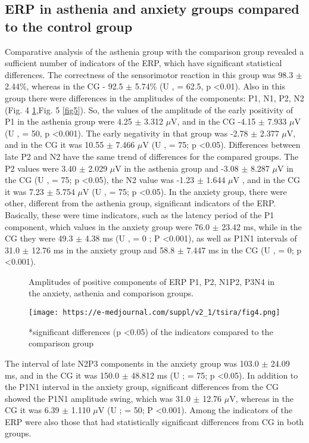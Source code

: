 \documentclass[twocolumn]{article}
\begin{document}
\subsection {ERP in asthenia and anxiety groups compared to the control group }
\par Comparative analysis of the asthenia group with the comparison group revealed a sufficient number of indicators of the ERP, which have significant statistical differences. The correctness of the sensorimotor reaction in this group was 98.3 $\pm$ 2.44\%, whereas in the CG - 92.5 $\pm$ 5.74\% (U \cite{bib15}, \cite{bib20} = 62.5, p \textless{}0.01). Also in this group there were differences in the amplitudes of the components: P1, N1, P2, N2 (Fig. 4 \ref{fig4},Fig. 5 \ref{fig5}). So, the values of the amplitude of the early positivity of P1 in the asthenia group were 4.25 $\pm$ 3.312 $\mu$V, and in the CG -4.15 $\pm$ 7.933 $\mu$V (U \cite{bib15}, \cite{bib20} = 50, p \textless{}0.001). The early negativity in that group was -2.78 $\pm$ 2.377 $\mu$V, and in the CG it was 10.55 $\pm$ 7.466 $\mu$V (U \cite{bib15}, \cite{bib20} = 75; p \textless{}0.05). Differences between late P2 and N2 have the same trend of differences for the compared groups. The P2 values were 3.40 $\pm$ 2.029 $\mu$V in the asthenia group and -3.08 $\pm$ 8.287 $\mu$V in the CG (U \cite{bib15}, \cite{bib20} = 75; p \textless{}0.05), the N2 value was -1.23 $\pm$ 1.644 $\mu$V , and in the CG it was 7.23 $\pm$ 5.754 $\mu$V (U \cite{bib15}, \cite{bib20} = 75; p \textless{}0.05). In the anxiety group, there were other, different from the asthenia group, significant indicators of the ERP. Basically, these were time indicators, such as the latency period of the P1 component, which values in the anxiety group were 76.0 $\pm$ 23.42 ms, while in the CG they were 49.3 $\pm$ 4.38 ms (U \cite{bib15}, \cite{bib20} = 0 ; P \textless{}0.001), as well as P1N1 intervals of 31.0 $\pm$ 12.76 ms in the anxiety group and 58.8 $\pm$ 7.447 ms in the CG (U \cite{bib15}, \cite{bib20} = 0; p \textless{}0.001). 
\begin{figure}
\caption{Amplitudes of positive components of ERP P1, P2, N1P2, P3N4 in the anxiety, asthenia and comparison groups.}
\label{fig4}
\texttt{[image: https://e-medjournal.com/suppl/v2\_1/tsira/fig4.png]}
\caption*{*significant differences (p \textless{}0.05) of the indicators compared to the comparison group}
\end{figure}
\par The interval of late N2P3 components in the anxiety group was 103.0 $\pm$ 24.09 ms, and in the CG it was 150.0 $\pm$ 48.812 ms (U \cite{bib15}; \cite{bib20} = 75; p \textless{}0.05). In addition to the P1N1 interval in the anxiety group, significant differences from the CG showed the  P1N1 amplitude swing, which was 31.0 $\pm$ 12.76 $\mu$V, whereas in the CG it was 6.39 $\pm$ 1.110 $\mu$V (U \cite{bib15}; \cite{bib20} = 50; P \textless{}0.001). Among the indicators of the ERP were also those that had statistically significant differences from CG in both groups. 
\end{document}

